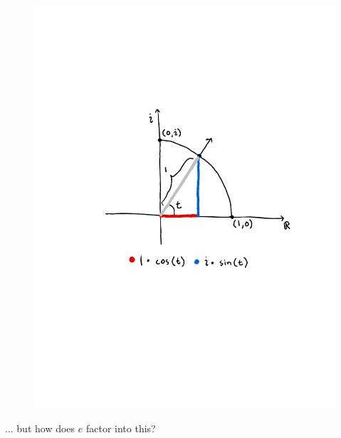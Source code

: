 \documentclass[11pt,serif,aspectratio=169]{beamer}
\begin{document}
	\begin{frame}[c]
		\begin{figure}
			\centering
			\includegraphics[height=0.9\paperheight]{polar-with-trig-complex.pdf}	
		\end{figure}
	\end{frame}
	
	
	\begin{frame}[c]\centering
		... but how does $e$ factor into this?
	\end{frame}
	
\end{document}
